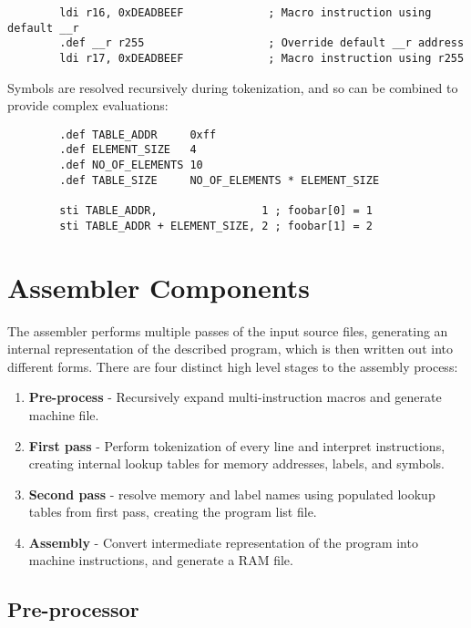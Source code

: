 \documentclass[12pt,twoside]{report}
\begin{document}
\begin{verbatim}
        ldi r16, 0xDEADBEEF             ; Macro instruction using default __r
        .def __r r255                   ; Override default __r address
        ldi r17, 0xDEADBEEF             ; Macro instruction using r255
\end{verbatim}

\noindent
Symbols are resolved recursively during tokenization, and so can be
combined to provide complex evaluations:

\begin{verbatim}
        .def TABLE_ADDR     0xff
        .def ELEMENT_SIZE   4
        .def NO_OF_ELEMENTS 10
        .def TABLE_SIZE     NO_OF_ELEMENTS * ELEMENT_SIZE

        sti TABLE_ADDR,                1 ; foobar[0] = 1
        sti TABLE_ADDR + ELEMENT_SIZE, 2 ; foobar[1] = 2
\end{verbatim}

\chapter{Assembler Components}

The assembler performs multiple passes of the input source files,
generating an internal representation of the described program, which
is then written out into different forms. There are four distinct high
level stages to the assembly process:

\begin{enumerate}
\item \textbf{Pre-process} - Recursively expand multi-instruction
  macros and generate machine file.
\item \textbf{First pass} - Perform tokenization of every line and
  interpret instructions, creating internal lookup tables for memory
  addresses, labels, and symbols.
\item \textbf{Second pass} - resolve memory and label names using
  populated lookup tables from first pass, creating the program list
  file.
\item \textbf{Assembly} - Convert intermediate representation of the
  program into machine instructions, and generate a RAM file.
\end{enumerate}

\section{Pre-processor}
\end{document}

